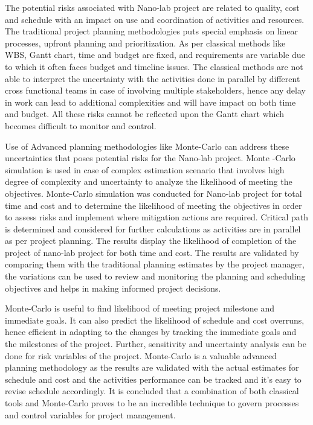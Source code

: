 \begin{SingleSpace}
The potential risks associated with Nano-lab project are related to quality, cost and schedule with an impact on use and coordination of activities and resources. The traditional project planning methodologies puts special emphasis on linear processes, upfront planning and prioritization. As per classical methods like WBS, Gantt chart, time and budget are fixed, and requirements are variable due to which it often faces budget and timeline issues. The classical methods are not able to interpret the uncertainty with the activities done in parallel by different cross functional teams in case of involving multiple stakeholders, hence any delay in work can lead to additional complexities and will have impact on both time and budget. All these risks cannot be reflected upon the Gantt chart which becomes difficult to monitor and control. 

Use of Advanced planning methodologies like Monte-Carlo can address these uncertainties that poses potential risks for the Nano-lab project. Monte -Carlo simulation is used in case of complex estimation scenario that involves high degree of complexity and uncertainty to analyze the likelihood of meeting the objectives.
Monte-Carlo simulation was conducted for Nano-lab project for total time and cost and to determine the likelihood of meeting the objectives in order to assess risks and implement where mitigation actions are required. Critical path is determined and considered for further calculations as activities are in parallel as per project planning. The results display the likelihood of completion of the project of nano-lab project for both time and cost. The results are validated by comparing them with the traditional planning estimates by the project manager, the variations can be used to review and monitoring the planning and scheduling objectives and helps in making informed project decisions. 

Monte-Carlo is useful to find likelihood of meeting project milestone and immediate goals. It can also predict the likelihood of schedule and cost overruns, hence efficient in adapting to the changes by tracking the immediate goals and the milestones of the project. Further, sensitivity and uncertainty analysis can be done for risk variables of the project. Monte-Carlo is a valuable advanced planning methodology as the results are validated with the actual estimates for schedule and cost and the activities performance can be tracked and it’s easy to revise schedule accordingly. It is concluded that a combination of both classical tools and Monte-Carlo proves to be an incredible technique to govern processes and control variables for project management.
 
\end{SingleSpace}
\clearpage